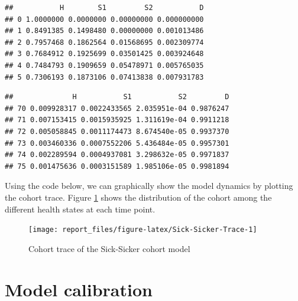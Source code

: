 \documentclass[]{book}
\newenvironment{Shaded}{\begin{snugshade}}{\end{snugshade}}
\newcommand{\KeywordTok}[1]{\textcolor[rgb]{0.13,0.29,0.53}{\textbf{#1}}}
\newcommand{\CommentTok}[1]{\textcolor[rgb]{0.56,0.35,0.01}{\textit{#1}}}
\newcommand{\OperatorTok}[1]{\textcolor[rgb]{0.81,0.36,0.00}{\textbf{#1}}}
\newcommand{\NormalTok}[1]{#1}
\begin{document}
\begin{Shaded}
\end{Shaded}

\begin{verbatim}
##           H        S1         S2           D
## 0 1.0000000 0.0000000 0.00000000 0.000000000
## 1 0.8491385 0.1498480 0.00000000 0.001013486
## 2 0.7957468 0.1862564 0.01568695 0.002309774
## 3 0.7684912 0.1925699 0.03501425 0.003924648
## 4 0.7484793 0.1909659 0.05478971 0.005765035
## 5 0.7306193 0.1873106 0.07413838 0.007931783
\end{verbatim}

\begin{Shaded}
\end{Shaded}

\begin{verbatim}
##              H           S1           S2         D
## 70 0.009928317 0.0022433565 2.035951e-04 0.9876247
## 71 0.007153415 0.0015935925 1.311619e-04 0.9911218
## 72 0.005058845 0.0011174473 8.674540e-05 0.9937370
## 73 0.003460336 0.0007552206 5.436484e-05 0.9957301
## 74 0.002289594 0.0004937081 3.298632e-05 0.9971837
## 75 0.001475636 0.0003151589 1.985106e-05 0.9981894
\end{verbatim}

Using the code below, we can graphically show the model dynamics by
plotting the cohort trace. Figure \ref{fig:Sick-Sicker-Trace} shows the
distribution of the cohort among the different health states at each
time point.

\begin{figure}[H]

{\centering \texttt{[image: report\_files/figure-latex/Sick-Sicker-Trace-1]} 

}

\caption{Cohort trace of the Sick-Sicker cohort model}\label{fig:Sick-Sicker-Trace}
\end{figure}

\chapter{Model calibration}\label{calibration}
\end{document}
